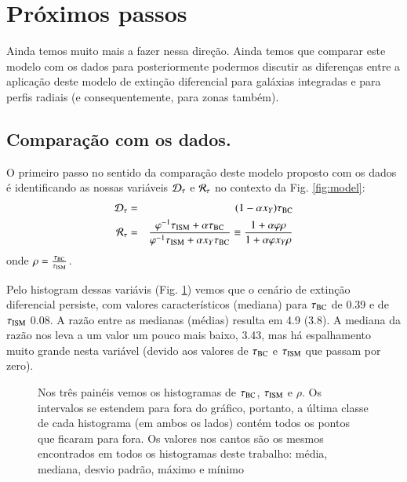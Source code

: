 \section{Próximos passos}
\label{sec:difextin:nextsteps}

Ainda temos muito mais a fazer nessa direção. Ainda temos que comparar este modelo com os dados
para posteriormente podermos discutir as diferenças entre a aplicação deste modelo de extinção
diferencial para galáxias integradas e para perfis radiais (e consequentemente, para zonas também).

\subsection{Comparação com os dados.}
\label{sec:difextin:nextsteps:comp}

O primeiro passo no sentido da comparação deste modelo proposto com os dados é identificando as
nossas variáveis $\mathcal{D}_\tau$ e $\mathcal{R}_\tau$ no contexto da Fig. \ref{fig:model}:
\begin{eqnarray}
	\mathcal{D}_\tau &=& (1 - \alpha x_Y) \tau_{\mathrm{BC}} \\
	\label{eq:DtauxY}
	\mathcal{R}_\tau &=& \frac{\varphi^{-1} \tau_{\mathrm{ISM}} + \alpha \tau_{\mathrm{BC}}}{\varphi^{-1} \tau_{\mathrm{ISM}} + \alpha x_Y \tau_{\mathrm{BC}}}
\equiv \frac{1 + \alpha \varphi \rho}{1 + \alpha \varphi x_Y \rho}
	\label{eq:RtauxY}
\end{eqnarray}
\noindent onde $\rho = \frac{\tau_{\mathrm{BC}}}{\tau_{\mathrm{ISM}}}$. 

Pelo histogram dessas variávis (Fig. \ref{fig:tauBCISM}) vemos que o cenário de extinção diferencial
persiste, com valores característicos (mediana) para $\tauBC$ de 0.39 e de $\tauISM$ 0.08. A razão
entre as medianas (médias) resulta em 4.9 (3.8). A mediana da razão nos leva a um valor um pouco
mais baixo, 3.43, mas há espalhamento muito grande nesta variável (devido aos valores de $\tauBC$ e
$\tauISM$ que passam por zero). 

\begin{figure}
	\centering
	\caption[Histogramas de $\tauBC$, $\tauISM$ e $\rho$.]
	{Nos três painéis vemos os histogramas de $\tauBC$, $\tauISM$ e $\rho$. Os intervalos se estendem
para fora do gráfico, portanto, a última classe de cada histograma (em ambos os lados) contém todos
os pontos que ficaram para fora. Os valores nos cantos são os mesmos encontrados em todos os
histogramas deste trabalho: média, mediana, desvio padrão, máximo e mínimo}
	\label{fig:tauBCISM}
\end{figure}

